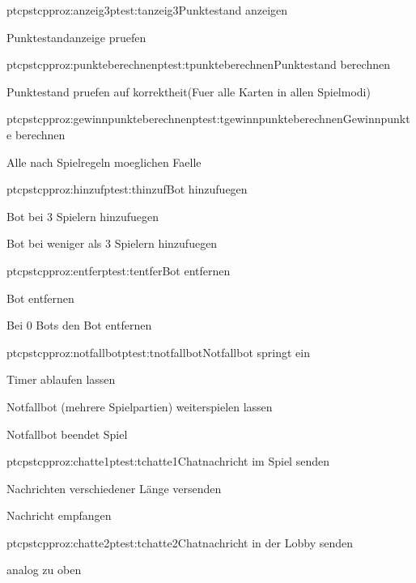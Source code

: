 \begin{description}[leftmargin=3em, style=sameline]
	\begin{pftp}{ptc}{pstc}{pproz:anzeig3}{ptest:tanzeig3}{Punktestand anzeigen}
		\item	Punktestandanzeige pruefen
	\end{pftp}
		
	\begin{pftp}{ptc}{pstc}{pproz:punkteberechnen}{ptest:tpunkteberechnen}{Punktestand berechnen}
		\item	Punktestand pruefen auf korrektheit(Fuer alle Karten in allen Spielmodi)
	\end{pftp}

	\begin{pftp}{ptc}{pstc}{pproz:gewinnpunkteberechnen}{ptest:tgewinnpunkteberechnen}{Gewinnpunkte berechnen}
		\item	Alle nach Spielregeln moeglichen Faelle
	\end{pftp}

	\begin{pftp}{ptc}{pstc}{pproz:hinzuf}{ptest:thinzuf}{Bot hinzufuegen}
		\item	Bot bei 3 Spielern hinzufuegen
		\item	Bot bei weniger als 3 Spielern hinzufuegen
	\end{pftp}
		
	\begin{pftp}{ptc}{pstc}{pproz:entfer}{ptest:tentfer}{Bot entfernen}
		\item	Bot entfernen
		\item	Bei 0 Bots den Bot entfernen
	\end{pftp}
		
	\begin{pftp}{ptc}{pstc}{pproz:notfallbot}{ptest:tnotfallbot}{Notfallbot springt ein}
		\item	Timer ablaufen lassen
		\item	Notfallbot (mehrere Spielpartien) weiterspielen lassen
		\item   Notfallbot beendet Spiel
	\end{pftp}
		
	\begin{pftp}{ptc}{pstc}{pproz:chatte1}{ptest:tchatte1}{Chatnachricht im Spiel senden}
		\item	Nachrichten verschiedener Länge versenden
		\item	Nachricht empfangen
	\end{pftp}

	\begin{pftp}{ptc}{pstc}{pproz:chatte2}{ptest:tchatte2}{Chatnachricht in der Lobby senden}
		\item analog zu oben
	\end{pftp}
		

\end{description}
